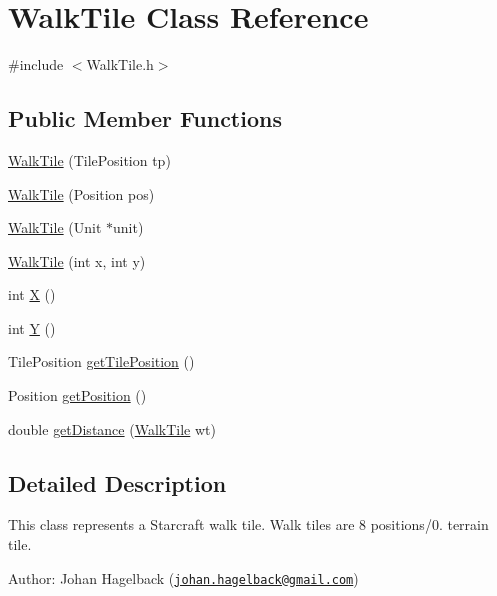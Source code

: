 \hypertarget{class_walk_tile}{\section{Walk\-Tile Class Reference}
\label{class_walk_tile}
}


{\ttfamily \#include $<$Walk\-Tile.\-h$>$}

\subsection*{Public Member Functions}
\begin{DoxyCompactItemize}
\item 
\hyperlink{class_walk_tile_ac694558494c54ac1d058ca86082912a2}{Walk\-Tile} (Tile\-Position tp)
\item 
\hyperlink{class_walk_tile_af532792f9c7e4a978b9c7e7f8ebf802c}{Walk\-Tile} (Position pos)
\item 
\hyperlink{class_walk_tile_a5abbafc81a2d90d9c5bbdfebd739b5ea}{Walk\-Tile} (Unit $\ast$unit)
\item 
\hyperlink{class_walk_tile_af8bc211e7c819451ecd6d47002b95960}{Walk\-Tile} (int x, int y)
\item 
int \hyperlink{class_walk_tile_a8d1200b5312a94f9e9db611ac6320ce3}{X} ()
\item 
int \hyperlink{class_walk_tile_afc15c4f046d0f4c01a65aa03486a6a85}{Y} ()
\item 
Tile\-Position \hyperlink{class_walk_tile_a492263379f433f11761661ef1eaba127}{get\-Tile\-Position} ()
\item 
Position \hyperlink{class_walk_tile_a667e0069bcef992e7306a60597ac98a6}{get\-Position} ()
\item 
double \hyperlink{class_walk_tile_afc645670c0d5a7246b2eeed32e1e9c0e}{get\-Distance} (\hyperlink{class_walk_tile}{Walk\-Tile} wt)
\end{DoxyCompactItemize}


\subsection{Detailed Description}
This class represents a Starcraft walk tile. Walk tiles are 8 positions/0. terrain tile.

Author\-: Johan Hagelback (\href{mailto:johan.hagelback@gmail.com}{\tt johan.\-hagelback@gmail.\-com}) 

